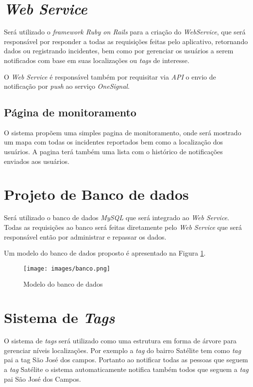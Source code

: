 \documentclass[	12pt, Times, openright, twoside, a4paper, english, brazil]{abntex2}
\begin{document}
\section{\textit{Web Service}}
Será utilizado o \textit{framework Ruby on Rails} para a criação do \textit{WebService}, que será responsável por responder a todas as requisições feitas pelo aplicativo, retornando dados ou registrando incidentes, bem como por gerenciar os usuários a serem notificados com base em suas localizações ou \textit{tags} de interesse.

O \textit{Web Service} é responsável também por requisitar via \textit{API} o envio de notificação por \textit{push} ao serviço \textit{OneSignal}.

\subsection{Página de monitoramento}
O sistema propõem uma simples pagina de monitoramento, onde será mostrado um mapa com todas os incidentes reportados bem como a localização dos usuários. A pagina terá também uma lista com o histórico de notificações enviados aos usuários.

\section{Projeto de Banco de dados}
Será utilizado o banco de dados \textit{MySQL} que será integrado ao \textit{Web Service}. Todas as requisições ao banco será feitas diretamente pelo \textit{Web Service} que será responsável então por administrar e repassar os dados.

Um modelo do banco de dados proposto é apresentado na Figura \ref{fig:Banco}.
\begin{figure}[h]
\centering %
\texttt{[image: images/banco.png]} %
\caption{Modelo do banco de dados}
\label{fig:Banco}
\end{figure}

\section{Sistema de \textit{Tags}}
\label{section:tags}
O sistema de \textit{tags} será utilizado como uma estrutura em forma de árvore para gerenciar níveis localizações. Por exemplo a \textit{tag} do bairro Satélite tem como \textit{tag} pai a tag São José dos campos. Portanto ao notificar todas as pessoas que seguem a \textit{tag} Satélite o sistema automaticamente notifica também todos que seguem a \textit{tag} pai São José dos Campos.
\end{document}

